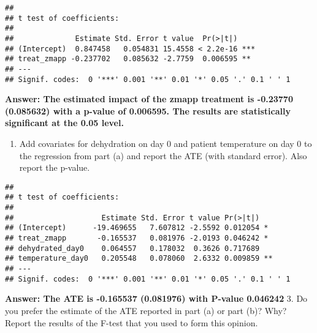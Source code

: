 \documentclass[
]{article}
\newenvironment{Shaded}{\begin{snugshade}}{\end{snugshade}}
\newcommand{\DataTypeTok}[1]{\textcolor[rgb]{0.13,0.29,0.53}{#1}}
\newcommand{\DecValTok}[1]{\textcolor[rgb]{0.00,0.00,0.81}{#1}}
\newcommand{\KeywordTok}[1]{\textcolor[rgb]{0.13,0.29,0.53}{\textbf{#1}}}
\newcommand{\NormalTok}[1]{#1}
\newcommand{\OperatorTok}[1]{\textcolor[rgb]{0.81,0.36,0.00}{\textbf{#1}}}
\newcommand{\StringTok}[1]{\textcolor[rgb]{0.31,0.60,0.02}{#1}}
\providecommand{\tightlist}{%
  \setlength{\itemsep}{0pt}\setlength{\parskip}{0pt}}
\begin{document}
\begin{verbatim}
## 
## t test of coefficients:
## 
##              Estimate Std. Error t value  Pr(>|t|)    
## (Intercept)  0.847458   0.054831 15.4558 < 2.2e-16 ***
## treat_zmapp -0.237702   0.085632 -2.7759  0.006595 ** 
## ---
## Signif. codes:  0 '***' 0.001 '**' 0.01 '*' 0.05 '.' 0.1 ' ' 1
\end{verbatim}

\textbf{Answer: The estimated impact of the zmapp treatment is -0.23770
(0.085632) with a p-value of 0.006595. The results are statistically
significant at the 0.05 level.}

\begin{enumerate}
\def\labelenumi{\arabic{enumi}.}
\setcounter{enumi}{1}
\tightlist
\item
  Add covariates for dehydration on day 0 and patient temperature on day
  0 to the regression from part (a) and report the ATE (with standard
  error). Also report the p-value.
\end{enumerate}

\begin{Shaded}
\end{Shaded}

\begin{verbatim}
## 
## t test of coefficients:
## 
##                    Estimate Std. Error t value Pr(>|t|)   
## (Intercept)      -19.469655   7.607812 -2.5592 0.012054 * 
## treat_zmapp       -0.165537   0.081976 -2.0193 0.046242 * 
## dehydrated_day0    0.064557   0.178032  0.3626 0.717689   
## temperature_day0   0.205548   0.078060  2.6332 0.009859 **
## ---
## Signif. codes:  0 '***' 0.001 '**' 0.01 '*' 0.05 '.' 0.1 ' ' 1
\end{verbatim}

\textbf{Answer: The ATE is -0.165537 (0.081976) with P-value 0.046242}
3. Do you prefer the estimate of the ATE reported in part (a) or part
(b)? Why? Report the results of the F-test that you used to form this
opinion.
\end{document}
